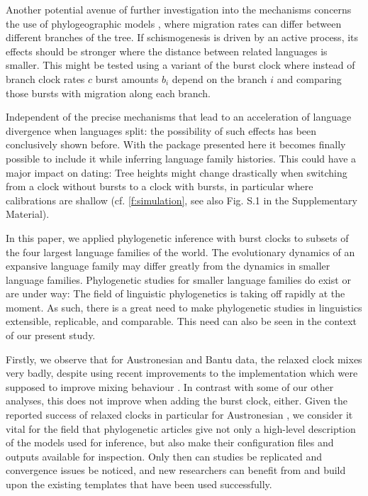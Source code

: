 \documentclass[]{rsos}%
\begin{document}
Another potential avenue of further investigation into the mechanisms
concerns the use of phylogeographic models \parencite{neureiter2021can}, where
migration rates can differ between different branches of the tree.
If schismogenesis is driven by an active process, its effects should be stronger
where the distance between related languages is smaller. This might be tested
using a variant of the burst clock where instead of branch clock rates $c$
burst amounts $b_i$ depend on the branch $i$ and comparing those bursts with
migration along each branch.

Independent of the precise mechanisms that lead to an acceleration of language divergence when languages split: the possibility of such effects has been conclusively shown before. With the package presented here it becomes finally possible to include it while inferring language family histories. This could have a major impact on dating: Tree heights might change drastically when switching from a clock without bursts to a clock with bursts, in particular where calibrations are shallow (cf. \cref{f:simulation}, see also Fig. S.1 in the Supplementary Material).

In this paper, we applied phylogenetic inference with burst clocks to subsets of the four largest language families of the world. The evolutionary dynamics of an expansive language family may differ greatly from the dynamics in smaller language families.
Phylogenetic studies for smaller language families do exist or are under way:
The field of linguistic phylogenetics is taking off rapidly at the moment.
As such, there is a great need to make phylogenetic studies in linguistics
extensible, replicable, and comparable. This need can also be seen in the context of
our present study.

Firstly, we observe that for
Austronesian and Bantu data, the relaxed clock mixes very badly, despite using
recent improvements to the implementation which were supposed to improve mixing
behaviour \parencite{orc}. In contrast with some of our other analyses, this does not improve when adding the burst clock, either. Given the reported success
of relaxed clocks in particular for Austronesian \parencite{gray2009language},
we consider it vital for the
field that phylogenetic articles give not only a high-level description of the
models used for inference, but also make their configuration files and outputs
available for inspection.
Only then can studies be replicated and convergence issues be noticed, and
new researchers can benefit from and build upon the existing templates that
have been used successfully.
\end{document}
